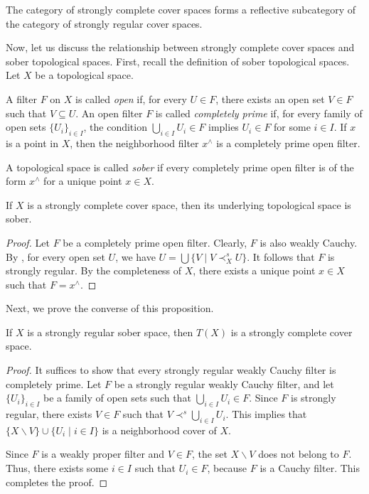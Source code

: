 \documentclass[reqno]{amsart}
\theoremstyle{definition}
\theoremstyle{remark}
\numberwithin{figure}{section}
\newcommand{\rb}{\prec}
\begin{document}
\begin{cor}
The category of strongly complete cover spaces forms a reflective subcategory of the category of strongly regular cover spaces.
\end{cor}

Now, let us discuss the relationship between strongly complete cover spaces and sober topological spaces.
First, recall the definition of sober topological spaces.
Let $X$ be a topological space.

A filter $F$ on $X$ is called \emph{open} if, for every $U \in F$, there exists an open set $V \in F$ such that $V \subseteq U$.
An open filter $F$ is called \emph{completely prime} if, for every family of open sets $\{ U_i \}_{i \in I}$, the condition $\bigcup_{i \in I} U_i \in F$ implies $U_i \in F$ for some $i \in I$.
If $x$ is a point in $X$, then the neighborhood filter $x^\wedge$ is a completely prime open filter.

A topological space is called \emph{sober} if every completely prime open filter is of the form $x^\wedge$ for a unique point $x \in X$.

\begin{prop}[u-sober]
If $X$ is a strongly complete cover space, then its underlying topological space is sober.
\end{prop}
\begin{proof}
Let $F$ be a completely prime open filter.
Clearly, $F$ is also weakly Cauchy.
By , for every open set $U$, we have $U = \bigcup \{ V \mid V \rb^s_X U \}$.
It follows that $F$ is strongly regular.
By the completeness of $X$, there exists a unique point $x \in X$ such that $F = x^\wedge$.
\end{proof}

Next, we prove the converse of this proposition.

\begin{prop}[t-complete]
If $X$ is a strongly regular sober space, then $T(X)$ is a strongly complete cover space.
\end{prop}
\begin{proof}
It suffices to show that every strongly regular weakly Cauchy filter is completely prime.
Let $F$ be a strongly regular weakly Cauchy filter, and let $\{ U_i \}_{i \in I}$ be a family of open sets such that $\bigcup_{i \in I} U_i \in F$.
Since $F$ is strongly regular, there exists $V \in F$ such that $V \rb^s \bigcup_{i \in I} U_i$.
This implies that $\{ X \backslash V \} \cup \{ U_i \mid i \in I \}$ is a neighborhood cover of $X$.

Since $F$ is a weakly proper filter and $V \in F$, the set $X \backslash V$ does not belong to $F$.
Thus, there exists some $i \in I$ such that $U_i \in F$, because $F$ is a Cauchy filter.
This completes the proof.
\end{proof}
\end{document}

